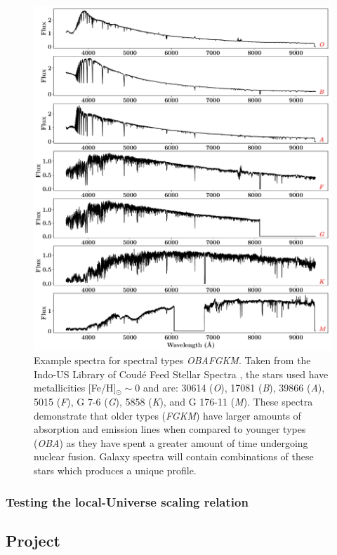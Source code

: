 \documentclass[12pt, twocolumn]{revtex4-1}    %
\begin{document}
\begin{figure}
\includegraphics[width=1.0\linewidth]{introduction/spectral_types}
\caption{Example spectra for spectral types \textit{OBAFGKM}. Taken from the Indo-US Library of Coudé Feed Stellar Spectra \citep{valdes_coude}, the stars used have metallicities [Fe/H]$_{\odot} \sim$0  and are: 30614 (\textit{O}), 17081 (\textit{B}), 39866 (\textit{A}), 5015 (\textit{F}), G 7-6 (\textit{G}), 5858 (\textit{K}), and G 176-11 (\textit{M}). These spectra demonstrate that older types (\textit{FGKM}) have larger amounts of absorption and emission lines when compared to younger types (\textit{OBA}) as they have spent a greater amount of time undergoing nuclear fusion. Galaxy spectra will contain combinations of these stars which produces a unique profile.}
\label{fig:spectral_types}
\end{figure}

\subsubsection{Testing the local-Universe scaling relation}

\subsection{Project} %
\end{document}
